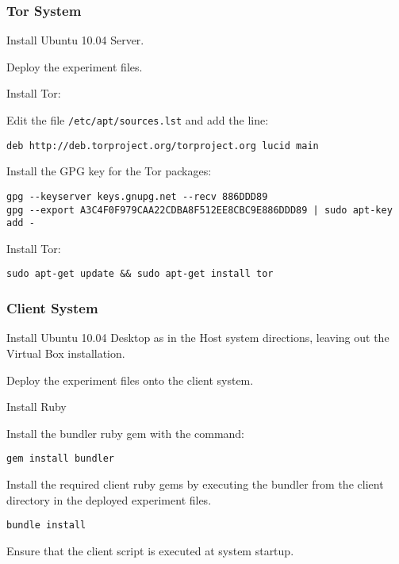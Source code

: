 \subsubsection{Tor System}

Install Ubuntu 10.04 Server.

Deploy the experiment files.

Install Tor:

\begin{enumerate*}
  \item Edit the file \verb+/etc/apt/sources.lst+ and add the line:
  \begin{verbatim}
deb http://deb.torproject.org/torproject.org lucid main
  \end{verbatim}
  \item Install the GPG key for the Tor packages:
  \begin{verbatim}
gpg --keyserver keys.gnupg.net --recv 886DDD89
gpg --export A3C4F0F979CAA22CDBA8F512EE8CBC9E886DDD89 | sudo apt-key add -
  \end{verbatim}
  \item Install Tor:
  \begin{verbatim}
sudo apt-get update && sudo apt-get install tor
  \end{verbatim}
\end{enumerate*}

\subsubsection{Client System}

Install Ubuntu 10.04 Desktop as in the Host system directions, leaving out the Virtual Box installation.

\begin{enumerate*}
  \item Deploy the experiment files onto the client system.
  \item Install Ruby
  \item Install the bundler ruby gem with the command:
    \begin{verbatim}
gem install bundler
    \end{verbatim}
  \item Install the required client ruby gems by executing the bundler from the client directory in the deployed experiment files.
    \begin{verbatim}
bundle install
    \end{verbatim}
  \item Ensure that the client script is executed at system startup.
\end{enumerate*}

